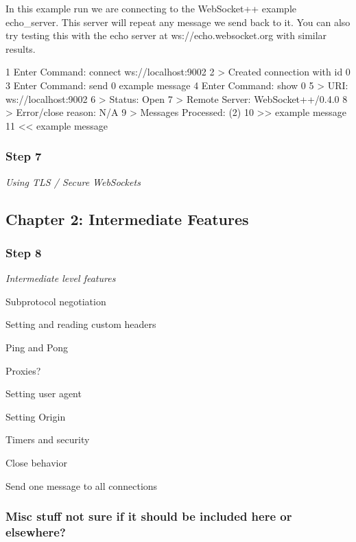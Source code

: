 In this example run we are connecting to the Web\+Socket++ example echo\+\_\+server. This server will repeat any message we send back to it. You can also try testing this with the echo server at {\ttfamily ws\+://echo.websocket.\+org} with similar results.


\begin{DoxyCode}
1 Enter Command: connect ws://localhost:9002
2 > Created connection with id 0
3 Enter Command: send 0 example message
4 Enter Command: show 0
5 > URI: ws://localhost:9002
6 > Status: Open
7 > Remote Server: WebSocket++/0.4.0
8 > Error/close reason: N/A
9 > Messages Processed: (2)
10 >>  example message
11 <<  example message
\end{DoxyCode}


\subsubsection*{Step 7}

{\itshape Using T\+LS / Secure Web\+Sockets}

\subsection*{Chapter 2\+: Intermediate Features }

\subsubsection*{Step 8}

{\itshape Intermediate level features}


\begin{DoxyItemize}
\item Subprotocol negotiation
\item Setting and reading custom headers
\item Ping and Pong
\item Proxies?
\item Setting user agent
\item Setting Origin
\item Timers and security
\item Close behavior
\item Send one message to all connections
\end{DoxyItemize}

\subsubsection*{Misc stuff not sure if it should be included here or elsewhere?}

